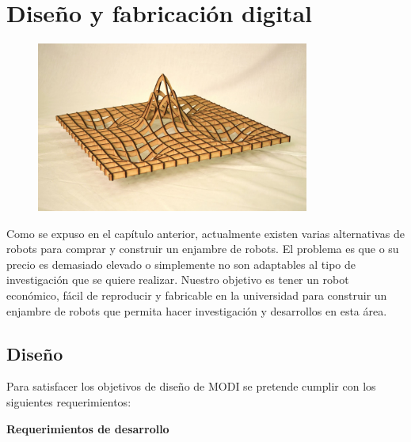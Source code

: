 \chapter{Diseño y fabricación digital} 

\label{Chapter4} 


\begin{figure}[htbp]
	\centering
		\includegraphics[width=0.8\textwidth]{./Figures/FabDig.JPG}
	\label{fig:MODI}
\end{figure}

Como se expuso en el capítulo anterior, actualmente existen varias alternativas de robots para comprar y construir un enjambre de robots. El problema es que o su precio es demasiado elevado o simplemente no son adaptables al tipo de investigación que se quiere realizar. Nuestro objetivo es tener un robot económico, fácil de reproducir y fabricable en la universidad para construir un enjambre de robots que permita hacer investigación y desarrollos en esta área.

\section{Diseño}

Para satisfacer los objetivos de diseño de MODI se pretende cumplir con los siguientes requerimientos:

\textbf{Requerimientos de desarrollo}

